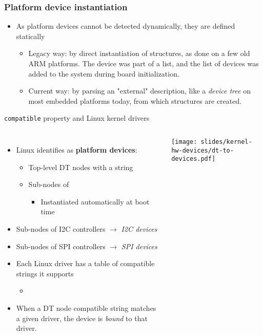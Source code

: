 \begin{frame}[fragile]
  \frametitle{Platform device instantiation}
  \begin{itemize}
  \item As platform devices cannot be detected dynamically, they are
    defined statically
    \begin{itemize}
    \item Legacy way: by direct instantiation of 
      structures, as done on a few old ARM platforms. The device was
      part of a list, and the list of devices was added to the system
      during board initialization.
    \item Current way: by parsing an "external" description, like a
      \emph{device tree} on most embedded platforms today, from which
       structures are created.
    \end{itemize}
  \end{itemize}
\end{frame}

\begin{frame}{{\tt compatible} property and Linux kernel drivers}
  \begin{columns}
    \begin{itemize}
    \item Linux identifies as {\bf platform devices}:
      \begin{itemize}
      \item Top-level DT nodes with a  string
      \item Sub-nodes of 
        \begin{itemize}
        \item Instantiated automatically at boot time
        \end{itemize}
      \end{itemize}
    \item Sub-nodes of I2C controllers $\rightarrow$ {\em I2C devices}
    \item Sub-nodes of SPI controllers $\rightarrow$ {\em SPI devices}
    \item Each Linux driver has a table of compatible strings it supports
      \begin{itemize}
      \item {}\code{[]}
      \end{itemize}
    \item When a DT node compatible string matches a given driver, the
      device is {\em bound} to that driver.
    \end{itemize}
    \texttt{[image: slides/kernel-hw-devices/dt-to-devices.pdf]}
  \end{columns}
\end{frame}

